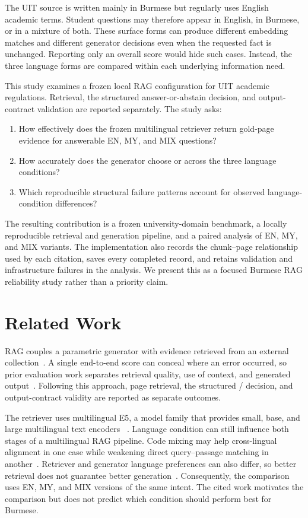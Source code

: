 \documentclass[a4paper,conference]{IEEEtran}
\newcommand{\code}[1]{\texttt{\detokenize{#1}}}
\begin{document}
The UIT source is written mainly in Burmese but regularly uses English academic terms. Student questions may therefore appear in English, in Burmese, or in a mixture of both. These surface forms can produce different embedding matches and different generator decisions even when the requested fact is unchanged. Reporting only an overall score would hide such cases. Instead, the three language forms are compared within each underlying information need.

This study examines a frozen local RAG configuration for UIT academic regulations. Retrieval, the structured answer-or-abstain decision, and output-contract validation are reported separately. The study asks:
\begin{enumerate}
    \item How effectively does the frozen multilingual retriever return gold-page evidence for answerable EN, MY, and MIX questions?
    \item How accurately does the generator choose \code{ANSWER} or \code{ABSTAIN} across the three language conditions?
    \item Which reproducible structural failure patterns account for observed language-condition differences?
\end{enumerate}

The resulting contribution is a frozen university-domain benchmark, a locally reproducible retrieval and generation pipeline, and a paired analysis of EN, MY, and MIX variants. The implementation also records the chunk--page relationship used by each citation, saves every completed record, and retains validation and infrastructure failures in the analysis. We present this as a focused Burmese RAG reliability study rather than a priority claim.

\section{Related Work}
RAG couples a parametric generator with evidence retrieved from an external collection~\cite{lewis2020rag}. A single end-to-end score can conceal where an error occurred, so prior evaluation work separates retrieval quality, use of context, and generated output~\cite{es2024ragas}. Following this approach, page retrieval, the structured \code{ANSWER}/\code{ABSTAIN} decision, and output-contract validity are reported as separate outcomes.

The retriever uses multilingual E5, a model family that provides small, base, and large multilingual text encoders ~\cite{wang2024e5}. Language condition can still influence both stages of a multilingual RAG pipeline. Code mixing may help cross-lingual alignment in one case while weakening direct query--passage matching in another~\cite{do2024contrastivemix}. Retriever and generator language preferences can also differ, so better retrieval does not guarantee better generation~\cite{park2025language}. Consequently, the comparison uses EN, MY, and MIX versions of the same intent. The cited work motivates the comparison but does not predict which condition should perform best for Burmese.
\end{document}
